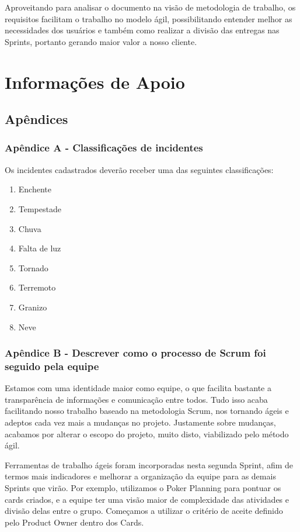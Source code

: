 \documentclass[12pt]{article}
\begin{document}
Aproveitando para analisar o documento na visão de metodologia de trabalho, os requisitos facilitam o trabalho no modelo ágil, possibilitando entender melhor as necessidades dos usuários e também como realizar a divisão das entregas nas Sprints, portanto gerando maior valor a nosso cliente.

\section{Informações de Apoio}
\subsection{Apêndices}
\subsubsection{Apêndice A - Classificações de incidentes}
Os incidentes cadastrados deverão receber uma das seguintes classificações:
\begin{enumerate}
    \item Enchente
    \item Tempestade
    \item Chuva
    \item Falta de luz
    \item Tornado
    \item Terremoto
    \item Granizo
    \item Neve
    
\end{enumerate}

\subsubsection{Apêndice B - Descrever como o processo de Scrum foi seguido pela equipe}

Estamos com uma identidade maior como equipe, o que facilita bastante a transparência de informações e comunicação entre todos. Tudo isso acaba facilitando nosso trabalho baseado na metodologia Scrum, nos tornando ágeis e adeptos cada vez mais a mudanças no projeto. Justamente sobre mudanças, acabamos por alterar o escopo do projeto, muito disto, viabilizado pelo método ágil.

Ferramentas de trabalho ágeis foram incorporadas nesta segunda Sprint, afim de termos mais indicadores e melhorar a organização da equipe para as demais Sprints que virão. Por exemplo, utilizamos o Poker Planning para pontuar os cards criados, e a equipe ter uma visão maior de complexidade das atividades e divisão delas entre o grupo. Começamos a utilizar o critério de aceite definido pelo Product Owner dentro dos Cards.
\end{document}
